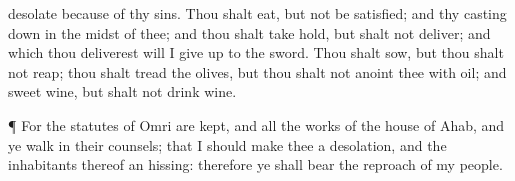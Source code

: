 {desolate because of thy
sins.
Thou shalt
eat, but not be
satisfied; and thy casting
down
{} in the
midst of thee; and thou shalt take
hold, but shalt not
deliver; and
{} which thou
deliverest will I give
up to the
sword.
Thou shalt
sow, but thou shalt not
reap; thou shalt
tread the
olives, but thou shalt not
anoint thee with
oil; and sweet
wine, but shalt not
drink
wine.
\par }{\PP {}¶ For the
statutes of
Omri are
kept, and all the
works of the
house of
Ahab, and ye
walk in their
counsels; that I should
make thee a
desolation, and the
inhabitants thereof an
hissing: therefore ye shall
bear the
reproach of my
people.

}

